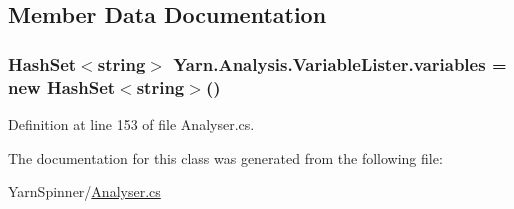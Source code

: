 \subsection{Member Data Documentation}
\hypertarget{a00166_a64ed6c3394c474b6cf5804a35f560746}{
\subsubsection[{variables}]{\setlength{\rightskip}{0pt plus 5cm}Hash\-Set$<$string$>$ Yarn.\-Analysis.\-Variable\-Lister.\-variables = new Hash\-Set$<$string$>$()\hspace{0.3cm}{\ttfamily [private]}}}\label{a00166_a64ed6c3394c474b6cf5804a35f560746}


Definition at line 153 of file Analyser.\-cs.



The documentation for this class was generated from the following file\-:\begin{DoxyCompactItemize}
\item 
Yarn\-Spinner/\hyperlink{a00279}{Analyser.\-cs}\end{DoxyCompactItemize}
